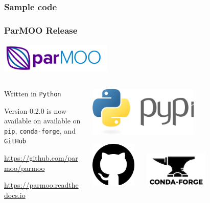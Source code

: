 \documentclass[aspectratio=169]{beamer}
\begin{document}
\begin{frame}[fragile]\frametitle{Sample code}
  \lstset{style=python}
  
\end{frame}

\begin{frame}\frametitle{ParMOO Release}

\begin{center}
\includegraphics[width=0.4\textwidth]{../img/logos/logo-parmoo.png}
\end{center}

\begin{columns}
\begin{column}{0.7\textwidth}

Written in {\tt Python}

\bigskip

Version 0.2.0 is now available on
available on {\tt pip}, {\tt conda-forge}, and {\tt GitHub}

\bigskip
\bigskip
\url{https://github.com/parmoo/parmoo}

\bigskip

\url{https://parmoo.readthedocs.io}
\end{column}
\begin{column}{0.2\textwidth}
\begin{center}
\includegraphics[width=0.6\textwidth]{../img/logos/logo-py.png}

\bigskip

\includegraphics[width=0.25\textwidth]{../img/logos/logo-gh.png}
$\quad$
\includegraphics[width=0.35\textwidth]{../img/logos/logo-conda.png}
\end{center}
\end{column}
\end{columns}


\end{frame}
\end{document}
